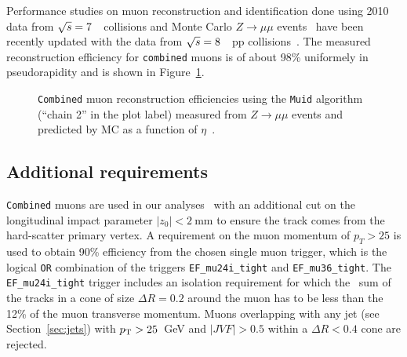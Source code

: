 Performance studies on muon reconstruction and identification done using 2010 data 
from $\rts=7$~\tev\ collisions and Monte Carlo $Z\to \mu\mu$ events~\cite{ATLAS-CONF-2011-063} 
have been recently updated with the data from $\rts=8$~\tev\ pp collisions~\cite{ATLAS-CONF-2013-088}.
The measured reconstruction efficiency for \texttt{combined} muons
is of about 98\% uniformely in pseudorapidity and 
is shown in Figure~\ref{fig:mueff}. 


\begin{figure}[tb]\begin{center}
	\caption{\texttt{Combined} muon reconstruction efficiencies using the \texttt{Muid} algorithm 
        (``chain 2'' in the plot label) measured from $Z\to \mu\mu$ events and predicted by MC as a function 
        of $\eta$~\cite{ATLAS-CONF-2013-088}.\label{fig:mueff}}
\end{center}\end{figure}


\tocless\subsection{Additional requirements}

\texttt{Combined} muons are used in our analyses~\cite{topcommon2013} with an additional cut on the longitudinal impact
parameter $|z_0|<2~$mm to ensure the track comes  from the hard-scatter primary vertex.
A requirement on the muon momentum of $p_T>25$ is used to obtain 90\% efficiency from the chosen 
single muon trigger, which is the logical \texttt{OR} combination of the 
triggers \texttt{EF\_mu24i\_tight} and \texttt{EF\_mu36\_tight}. 
The \texttt{EF\_mu24i\_tight} trigger includes an isolation requirement 
for which the \pt\ sum of the tracks in a cone of size $\Delta R=0.2$  around the muon
has to be less than the 12\% of the muon transverse momentum.
Muons overlapping with any jet (see Section~\ref{sec:jets}) with $\pt>25$~GeV and $|JVF|>0.5$ 
within a $\Delta R<0.4$ cone are rejected.

